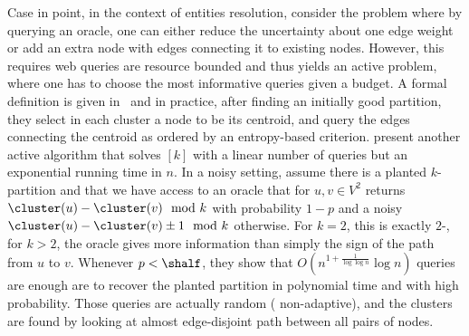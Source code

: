 
Case in point, in the context of entities resolution, \textcite{activeCoref07} consider the \pcc{}
problem where by querying an oracle, one can either reduce the uncertainty about one edge weight or
add an extra node with edges connecting it to existing nodes. However, this requires web queries are
resource bounded and thus yields an active problem, where one has to choose the most informative
queries given a budget. A formal definition is given in~\autocite{queryMoreEdgeCC07} and in
practice, after finding an initially good partition, they select in each cluster a node to be its
centroid, and query the edges connecting the centroid as ordered by an entropy-based criterion.
\textcite[Section 5]{Ailon2014} present another active algorithm that solves \mind$[k]$ with a
linear number of queries but an exponential running time in $n$.  In a noisy setting,
\textcite{Mitzenmacher2016} assume there is a planted $k$-partition and that we have access to an
oracle that for $u,v\in V^2$ returns $\cluster(u) - \cluster(v) \mod k$ with probability $1-p$ and a
noisy $\cluster(u) - \cluster(v) \pm 1 \mod k$ otherwise. For $k=2$, this is exactly $2$-\pcc{}, for
$k>2$, the oracle gives more information than simply the sign of the path from $u$ to $v$. Whenever
$p < \shalf$, they show that $O(n^{1+\frac{1}{\log\log n}}\log n)$ queries are enough are to recover
the planted partition in polynomial time and with high probability. Those queries are actually
random (\ie{} non-adaptive), and the clusters are found by looking at almost edge-disjoint path
between all pairs of nodes.

